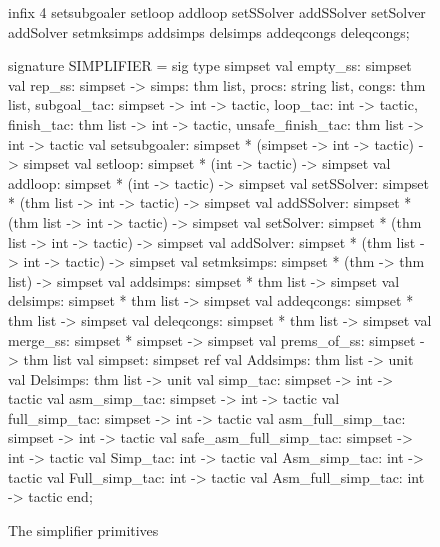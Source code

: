 \begin{figure}

\begin{ttbox}
infix 4 setsubgoaler setloop addloop 
        setSSolver addSSolver setSolver addSolver 
        setmksimps addsimps delsimps addeqcongs deleqcongs;

signature SIMPLIFIER =
sig
  type simpset
  val empty_ss: simpset
  val rep_ss: simpset -> {\ttlbrace}simps: thm list, procs: string list, 
                          congs: thm list,
                          subgoal_tac:        simpset -> int -> tactic,
                          loop_tac:                      int -> tactic,
                                 finish_tac: thm list -> int -> tactic,
                          unsafe_finish_tac: thm list -> int -> tactic{\ttrbrace}
  val setsubgoaler: simpset *  (simpset -> int -> tactic) -> simpset
  val setloop:      simpset *             (int -> tactic) -> simpset
  val addloop:      simpset *             (int -> tactic) -> simpset
  val setSSolver:   simpset * (thm list -> int -> tactic) -> simpset
  val addSSolver:   simpset * (thm list -> int -> tactic) -> simpset
  val setSolver:    simpset * (thm list -> int -> tactic) -> simpset
  val addSolver:    simpset * (thm list -> int -> tactic) -> simpset
  val setmksimps:  simpset * (thm -> thm list) -> simpset
  val addsimps:    simpset * thm list -> simpset
  val delsimps:    simpset * thm list -> simpset
  val addeqcongs:  simpset * thm list -> simpset
  val deleqcongs:  simpset * thm list -> simpset
  val merge_ss:    simpset * simpset -> simpset
  val prems_of_ss: simpset -> thm list
  val simpset:     simpset ref
  val Addsimps: thm list -> unit
  val Delsimps: thm list -> unit
  val               simp_tac: simpset -> int -> tactic
  val           asm_simp_tac: simpset -> int -> tactic
  val          full_simp_tac: simpset -> int -> tactic
  val      asm_full_simp_tac: simpset -> int -> tactic
  val safe_asm_full_simp_tac: simpset -> int -> tactic
  val               Simp_tac:            int -> tactic
  val           Asm_simp_tac:            int -> tactic
  val          Full_simp_tac:            int -> tactic
  val      Asm_full_simp_tac:            int -> tactic
end;
\end{ttbox}
\caption{The simplifier primitives} \label{SIMPLIFIER}
\end{figure}


